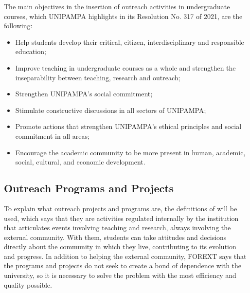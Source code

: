 The main objectives in the insertion of outreach activities in undergraduate courses, which \ac{UNIPAMPA} highlights in its Resolution No. 317 of 2021, \cite{CONSUNI-Unipampa:2021} are the following:
\begin{itemize}
  \item Help students develop their critical, citizen, interdisciplinary and responsible education;
  \item Improve teaching in undergraduate courses as a whole and strengthen the inseparability between teaching, research and outreach;
  \item Strengthen \ac{UNIPAMPA}'s social commitment;
  \item Stimulate constructive discussions in all sectors of \ac{UNIPAMPA}; 
  \item Promote actions that strengthen \ac{UNIPAMPA}'s ethical principles and social commitment in all areas;
  \item Encourage the academic community to be more present in human, academic, social, cultural, and economic development.
\end{itemize}

\subsection{Outreach Programs and Projects}\label{sec:3.2.1}


To explain what outreach projects and programs are, the definitions of  will be used, which says that they are activities regulated internally by the institution that articulates events involving teaching and research, always involving the external community.
With them, students can take attitudes and decisions directly about the community in which they live, contributing to its evolution and progress.
In addition to helping the external community, \ac{FOREXT} says that the programs and projects do not seek to create a bond of dependence with the university, so it is necessary to solve the problem with the most efficiency and quality possible.

